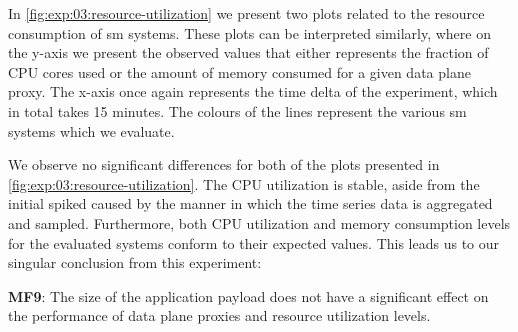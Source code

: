 In \cref{fig:exp:03:resource-utilization} we present two plots related to the resource consumption of \gls{sm} systems. These plots can be interpreted similarly, where on the y-axis we present the observed values that either represents the fraction of CPU cores used or the amount of memory consumed for a given data plane proxy. The x-axis once again represents the time delta of the experiment, which in total takes 15 minutes. The colours of the lines represent the various \gls{sm} systems which we evaluate.

We observe no significant differences for both of the plots presented in \cref{fig:exp:03:resource-utilization}. The CPU utilization is stable, aside from the initial spiked caused by the manner in which the time series data is aggregated and sampled. Furthermore, both CPU utilization and memory consumption levels for the evaluated systems conform to their expected values. This leads us to our singular conclusion from this experiment:

\begin{shaded*}
    \noindent
    \textbf{MF9}:
    The size of the application payload does not have a significant effect on the performance of data plane proxies and resource utilization levels.
\end{shaded*}

